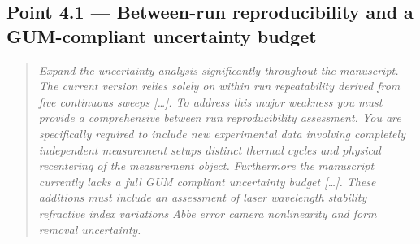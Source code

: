 \documentclass[11pt,a4paper]{article}
\newenvironment{reviewercomment}%
{\par\medskip\noindent\begin{quotation}\itshape\color{black!70}}%
{\end{quotation}\medskip}
\begin{document}
\subsection*{Point 4.1 --- Between-run reproducibility and a GUM-compliant uncertainty budget}
\begin{reviewercomment}
Expand the uncertainty analysis significantly throughout the manuscript. The current version relies solely on within run repeatability derived from five continuous sweeps [\ldots]. To address this major weakness you must provide a comprehensive between run reproducibility assessment. You are specifically required to include new experimental data involving completely independent measurement setups distinct thermal cycles and physical recentering of the measurement object. Furthermore the manuscript currently lacks a full GUM compliant uncertainty budget [\ldots]. These additions must include an assessment of laser wavelength stability refractive index variations Abbe error camera nonlinearity and form removal uncertainty.
\end{reviewercomment}
\end{document}
